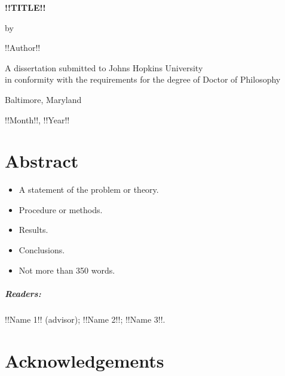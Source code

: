 \documentclass[12pt, oneside]{book}
\begin{document}
\frontmatter

\begin{center}
  \begin{singlespace}
    \vspace*{0.5in}

    \textbf{\uppercase{!!Title!!}}

    \vspace*{1in}

    by
    
    !!Author!!

    \vspace*{1.5in}

    A dissertation submitted to Johns Hopkins University\\in conformity with the requirements for the degree of Doctor of Philosophy

    \vspace*{0.5in}

    Baltimore, Maryland
    
    !!Month!!, !!Year!!
  \end{singlespace}
\end{center}

\thispagestyle{empty}
\clearpage

\chapter{Abstract}

\begin{itemize}
  \item A statement of the problem or theory.
  \item Procedure or methods.
  \item Results.
  \item Conclusions.
  \item Not more than 350 words.
\end{itemize}

\paragraph{Readers:} !!Name 1!! (advisor); !!Name 2!!; !!Name 3!!.

\chapter{Acknowledgements}

\lipsum[1] %

\tableofcontents
\listoftables
\listoffigures
\end{document}
